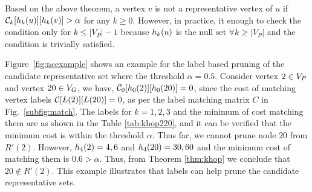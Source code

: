 Based on the above theorem, a vertex $v$ is not a representative vertex
of $u$ if $\mathcal{C}_{k}[h_{k}(u)][h_{k}(v)] > \alpha$ for any $k \geq 0$. However, in
practice, it enough to check the condition only for $k \leq |V_P|-1$
because $h_{k}(u)$ is the null set $\forall k \geq |V_P|$ and the
condition is trivially satisfied.

Figure~\ref{fig:ncexample} shows an example for the \khop label based
pruning of the candidate representative set where the threshold $\alpha
= 0.5$. Consider vertex $2 \in V_P$ and vertex $20 \in V_G$, we have,
$\mathcal{C}_{0}[h_{0}(2)][h_{0}(20)] = 0$, since the cost of matching vertex labels
${\mathcal{C}}[L(2)][L(20)] = 0$, as per the label matching matrix $C$ in
Fig.~\ref{subfig:match}. The \khop labels for $k=1,2,3$ and the minimum
of cost matching them are as shown in the Table \ref{tab:khop220}, and
it can be verified that the minimum cost is within the threshold
$\alpha$. Thus far, we cannot prune node $20$ from $R'(2)$.  However, $h_{4}(2)
= 4, 6 $ and $h_{4}(20) = 30, 60$ and the minimum cost of matching
them is $0.6 > \alpha$.  Thus, from Theorem \ref{thm:khop} we conclude
that $20 \notin R'(2)$. This example illustrates that \khop labels can
help prune the candidate representative sets.


